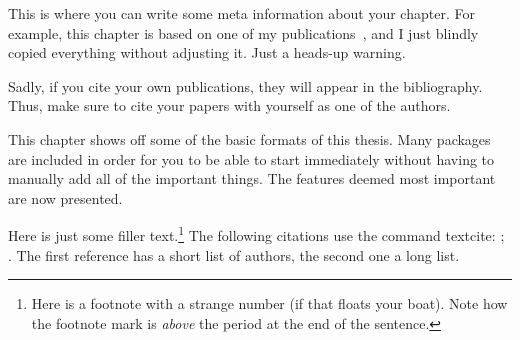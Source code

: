 \begin{jointwork}
    This is where you can write some meta information about your chapter. For example, this chapter is based on one of my publications~\cite{firstDemoReference}, and I just blindly copied everything without adjusting it. Just a heads-up warning.
    
    Sadly, if you cite your own publications, they will appear in the bibliography. Thus, make sure to cite your papers with yourself as one of the authors.
\end{jointwork}

This chapter shows off some of the basic formats of this thesis. Many packages are included in order for you to be able to start immediately without having to manually add all of the important things. The features deemed most important are now presented.

Here is just some filler text.\footnote[-0.2][][15]{Here is a footnote with a strange number (if that floats your boat). Note how the footnote mark is \emph{above} the period at the end of the sentence.} The following citations use the command \textsf{textcite}: \textcite{firstDemoReference}; \textcite{secondDemoReference}. The first reference has a short list of authors, the second one a long list.

